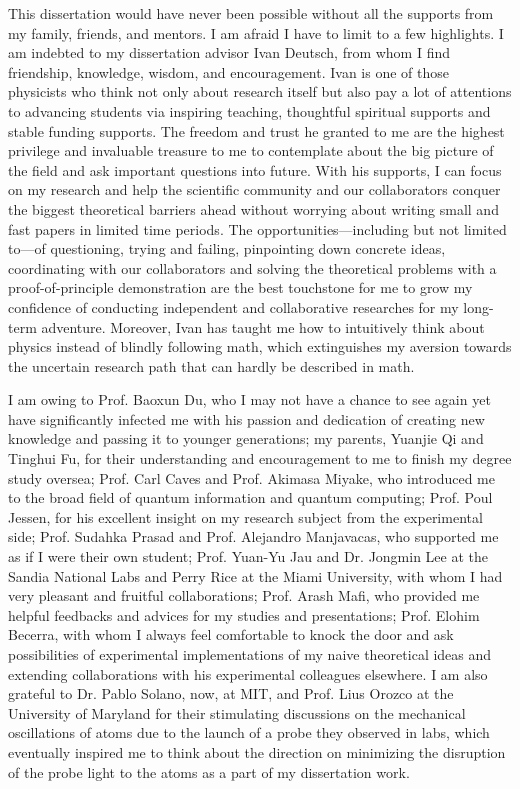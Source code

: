 \begin{acknowledgments}
\noindent This dissertation would have never been possible without all the supports from my family, friends, and mentors.
I am afraid I have to limit to a few highlights. 
I am indebted to my dissertation advisor Ivan Deutsch, from whom I find friendship, knowledge, wisdom, and encouragement.  
Ivan is one of those physicists who think not only about research itself but also pay a lot of attentions to advancing students via inspiring teaching, thoughtful spiritual supports and stable funding supports. 
The freedom and trust he granted to me are the highest privilege and invaluable treasure to me to contemplate about the big picture of the field and ask important questions into future.
With his supports, I can focus on my research and help the scientific community and our collaborators conquer the biggest theoretical barriers ahead without worrying about writing small and fast papers in limited time periods. 
The opportunities---including but not limited to---of questioning, trying and failing, pinpointing down concrete ideas, coordinating with our collaborators and solving the theoretical problems with a proof-of-principle demonstration are the best touchstone for me to grow my confidence of conducting independent and collaborative researches for my long-term adventure. 
Moreover, Ivan has taught me how to intuitively think about physics instead of blindly following math, which extinguishes my aversion towards the uncertain research path that can hardly be described in math. 

I am owing to Prof. Baoxun Du, who I may not have a chance to see again yet have significantly infected me with his passion and dedication of creating new knowledge and passing it to younger generations; 
my parents, Yuanjie Qi and Tinghui Fu, for their understanding and encouragement to me to finish my degree study oversea; 
Prof. Carl Caves and Prof. Akimasa Miyake, who introduced me to the broad field of quantum information and quantum computing; 
Prof. Poul Jessen, for his excellent insight on my research subject from the experimental side; 
Prof. Sudahka Prasad and Prof. Alejandro Manjavacas, who supported me as if I were their own student; 
Prof. Yuan-Yu Jau and Dr. Jongmin Lee at the Sandia National Labs and Perry Rice at the Miami University, with whom I had very pleasant and fruitful collaborations; 
Prof. Arash Mafi, who provided me helpful feedbacks and advices for my studies and presentations; 
Prof. Elohim Becerra, with whom I always feel comfortable to knock the door and ask possibilities of experimental implementations of my naive theoretical ideas and extending collaborations with his experimental colleagues elsewhere. 
I am also grateful to Dr. Pablo Solano, now, at MIT, and Prof. Lius Orozco at the University of Maryland for their stimulating discussions on the mechanical oscillations of atoms due to the launch of a probe they observed in labs, which eventually inspired me to think about the direction on minimizing the disruption of the probe light to the atoms as a part of my dissertation work. 


\end{acknowledgments}
